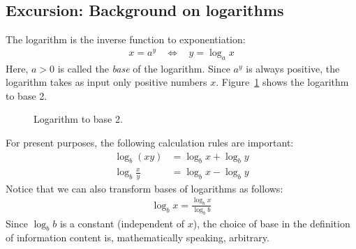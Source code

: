 \documentclass[nobib,nofonts]{tufte-handout}
\begin{document}
\subsection{Excursion: Background on logarithms}

The logarithm is the inverse function to exponentiation:
\begin{align*}
   x = a^{y} \ \ \ \  \Leftrightarrow  \ \ \ \  y = \log_{a} x
\end{align*}
Here, $a > 0$ is called the \emph{base} of the logarithm.
Since $a^{y}$ is always positive, the logarithm takes as input only positive numbers $x$.
Figure~\ref{fig:logarithm} shows the logarithm to base 2.

\begin{figure}
  \centering

\caption{Logarithm to base 2.}
\label{fig:logarithm}
\end{figure}

For present purposes, the following calculation rules are important:
\begin{align*}
  \log_{b}( x y ) & = \log_{b} x + \log_{b} y \\
  \log_{b} \frac{x}{y} & = \log_{b} x - \log_{b} y
\end{align*}
Notice that we can also transform bases of logarithms as follows:
\begin{align*}
  \log_{b} x = \frac{\log_{b} x}{\log_{b} b}
\end{align*}
Since $\log_{b} b$ is a constant (independent of $x$), the choice of base in the definition of information content is, mathematically speaking, arbitrary.
\end{document}
